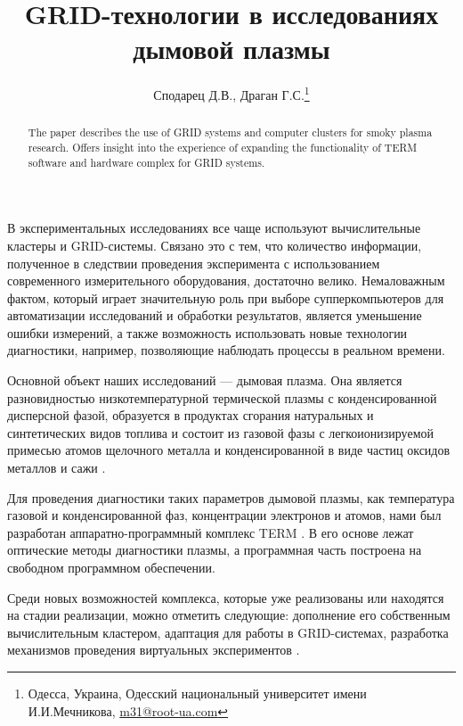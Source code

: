 \documentclass[10pt, a5paper]{article}
\begin{document}
\title{GRID-технологии в исследованиях дымовой плазмы}
\author{Сподарец Д.В., Драган Г.С.\footnote{Одесса, Украина, Одесский национальный университет имени И.И.Мечникова, \url{m31@root-ua.com}}}
\date{}
\maketitle
\begin{abstract}
The paper describes the use of GRID systems and computer clusters for smoky plasma research. Offers insight into the experience of expanding the functionality of TERM software and hardware complex for GRID systems.
\end{abstract}
В экспериментальных исследованиях все чаще используют  вычислительные кластеры и GRID-системы. Связано это с тем, что количество информации, полученное в следствии проведения эксперимента с использованием современного измерительного оборудования, достаточно велико. Немаловажным фактом, который играет значительную роль при выборе супперкомпьютеров для автоматизации исследований и обработки результатов, является уменьшение ошибки измерений, а также возможность использовать новые технологии диагностики, например, позволяющие наблюдать процессы в реальном времени.

Основной объект наших исследований --- дымовая плазма. Она является разновидностью низкотемпературной термической плазмы с конденсированной дисперсной фазой, образуется в продуктах сгорания натуральных и синтетических видов топлива и состоит из газовой фазы с легкоионизируемой примесью атомов щелочного металла и конденсированной в виде частиц оксидов металлов и сажи \cite{spod1}.

Для проведения диагностики таких параметров дымовой плазмы, как температура газовой и конденсированной фаз, концентрации электронов и атомов, нами был разработан аппаратно-программный комплекс TERM \cite{spod2}. В его основе лежат оптические методы диагностики плазмы, а программная часть построена на свободном программном обеспечении. 

Среди новых возможностей комплекса, которые уже реализованы или находятся на стадии реализации, можно отметить следующие: дополнение его собственным вычислительным кластером, адаптация для работы в GRID-системах, разработка механизмов проведения виртуальных экспериментов \cite{spod3}.
\end{document}
